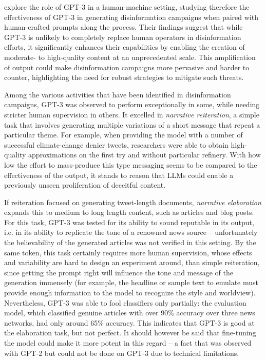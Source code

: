 \citet{buchanan2021truth} explore the role of GPT-3 in a human-machine setting, studying therefore the effectiveness of GPT-3 in generating disinformation campaigns when paired with human-crafted prompts along the process.
Their findings suggest that while GPT-3 is unlikely to completely replace human operators in disinformation efforts, it significantly enhances their capabilities by enabling the creation of moderate- to high-quality content at an unprecedented scale.
This amplification of output could make disinformation campaigns more pervasive and harder to counter, highlighting the need for robust strategies to mitigate such threats.

Among the various activities that have been identified in disinformation campaigns, GPT-3 was observed to perform exceptionally in some, while needing stricter human supervision in others.
It excelled in \emph{narrative reiteration}, a simple task that involves generating multiple variations of a short message that repeat a particular theme.
For example, when providing the model with a number of successful climate-change denier tweets, researchers were able to obtain high-quality approximations on the first try and without particular refinery.
With how low the effort to mass-produce this type messaging seems to be compared to the effectiveness of the output, it stands to reason that LLMs could enable a previously unseen proliferation of deceitful content.

If reiteration focused on generating tweet-length documents, \emph{narrative elaboration} expands this to medium to long length content, such as articles and blog posts.
For this task, GPT-3 was tested for its ability to sound reputable in its output, i.e. in its ability to replicate the tone of a renowned news source -- unfortunately the believability of the generated articles was not verified in this setting.
By the same token, this task certainly requires more human supervision, whose effects and variability are hard to design an experiment around, than simple reiteration, since getting the prompt right will influence the tone and message of the generation immensely (for example, the headline or sample text to emulate must provide enough information to the model to recognize the style and worldview).
Nevertheless, GPT-3 was able to fool classifiers only partially: the evaluation model, which classified genuine articles with over 90\% accuracy over three news networks, had only around 65\% accuracy.
This indicates that GPT-3 is good at the elaboration task, but not perfect.
It should however be said that fine-tuning the model could make it more potent in this regard -- a fact that was observed with GPT-2 but could not be done on GPT-3 due to technical limitations.

